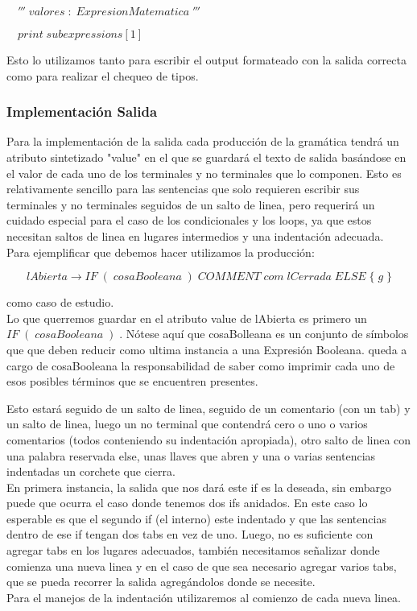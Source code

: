 $\quad'''\; valores\; :\; ExpresionMatematica\;'''$

$\quad print\; subexpressions[1]$


Esto lo utilizamos tanto para escribir el output formateado con la salida correcta como para realizar el chequeo de tipos.

\subsubsection{Implementación Salida}

Para la implementación de la salida cada producción de la gramática tendrá un atributo sintetizado "value" en el que se guardará el texto de salida basándose en el valor de cada uno de los terminales y no terminales que lo componen. Esto es relativamente sencillo para las sentencias que solo requieren escribir sus terminales y no terminales seguidos de un salto de linea, pero requerirá un cuidado especial para el caso de los condicionales y los loops, ya que estos necesitan saltos de linea en lugares intermedios y una indentación adecuada.
\\
Para ejemplificar que debemos hacer utilizamos la producción:

$$lAbierta \rightarrow IF\; (\; cosaBooleana\; )\; COMMENT\; com\; lCerrada\; ELSE\; \{\; g\; \}$$ 

como caso de estudio.
\\
Lo que querremos guardar en el atributo value de lAbierta es primero un $IF\; (\; cosaBooleana\; )\;$. Nótese aquí que cosaBolleana es un conjunto de símbolos que que deben reducir como ultima instancia a una Expresión Booleana. queda a cargo de cosaBooleana la responsabilidad de saber como imprimir cada uno de esos posibles términos que se encuentren presentes.

Esto estará seguido de un salto de linea, seguido de un comentario (con un tab) y un salto de linea, luego un no terminal que contendrá cero o uno o varios comentarios (todos conteniendo su indentación apropiada), otro salto de linea con una palabra reservada else, unas llaves que abren y una o varias sentencias indentadas un corchete que cierra.
\\
En primera instancia, la salida que nos dará este if es la deseada, sin embargo puede que ocurra el caso donde tenemos dos ifs anidados. En este caso lo esperable es que el segundo if (el interno) este indentado y que las sentencias dentro de ese if tengan dos tabs en vez de uno. Luego, no es suficiente con agregar tabs en los lugares adecuados, también necesitamos señalizar donde comienza una nueva linea y en el caso de que sea necesario agregar varios tabs, que se pueda recorrer la salida agregándolos donde se necesite.
\\
Para el manejos de la indentación utilizaremos al comienzo de cada nueva linea.

